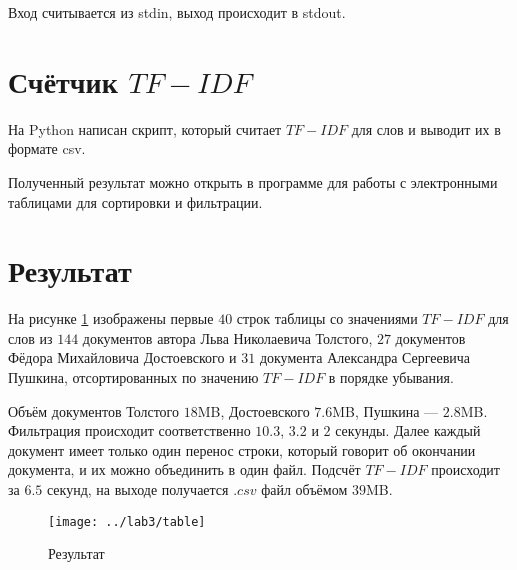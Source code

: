 Вход считывается из stdin, выход происходит в stdout.

\lstset{inputencoding=utf8, extendedchars=\true}


\section{Счётчик $TF-IDF$}
На Python написан скрипт, который считает $TF-IDF$ для слов
и выводит их в формате csv.

Полученный результат можно открыть в программе для работы
с электронными таблицами для сортировки и фильтрации.

\lstset{inputencoding=utf8, extendedchars=\true}


\section{Результат}
На рисунке \ref{fig:tfidf:table} изображены первые $40$ строк таблицы
со значениями $TF-IDF$ для слов из $144$ документов автора
Льва Николаевича Толстого, $27$ документов Фёдора Михайловича Достоевского
и $31$ документа Александра Сергеевича Пушкина, отсортированных по значению
$TF-IDF$ в порядке убывания.

Объём документов Толстого $18$MB, Достоевского $7.6$MB, Пушкина --- $2.8$MB.
Фильтрация происходит соответственно $10.3$, $3.2$ и $2$ секунды.
Далее каждый документ имеет только один перенос строки,
который говорит об окончании документа, и их можно объединить в один файл.
Подсчёт $TF-IDF$ происходит за $6.5$ секунд,
на выходе получается $.csv$ файл объёмом $39$MB.

\begin{figure}[h]
  \centering
  \texttt{[image: ../lab3/table]}
  \caption{Результат}
  \label{fig:tfidf:table}
\end{figure}


